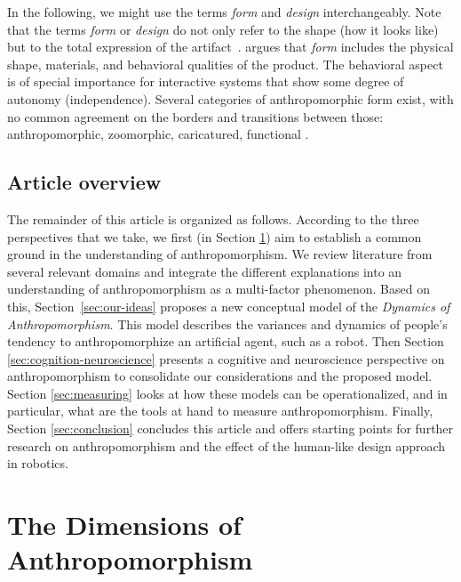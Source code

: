 \documentclass{frontiersSCNS} %
\begin{document}
In the following, we might use the terms \emph{form} and \emph{design}
interchangeably. Note that the terms \textit{form} or {\it design} do not only
refer to the shape (how it looks like) but to the total expression of the
artifact~\citep{bartneck_shaping_2004}. \citet{disalvo_hug:_2003} argues that
\textit{form} includes the physical shape, materials, and behavioral qualities
of the product. The behavioral aspect is of special importance for interactive
systems that show some degree of autonomy (independence).  Several categories of
anthropomorphic form exist, with no common agreement on the borders and
transitions between those: anthropomorphic, zoomorphic, caricatured, functional
\citep{fong_survey_2003}.


\subsection{Article overview}

The remainder of this article is organized as follows.  According to the three
perspectives that we take, we first (in Section \ref{sec:anthropomorphism}) aim
to establish a common ground in the understanding of anthropomorphism. We review
literature from several relevant domains and integrate the different
explanations into an understanding of anthropomorphism as a multi-factor
phenomenon.  Based on this, Section~\ref{sec:our-ideas} proposes a new
conceptual model of the \textit{Dynamics of Anthropomorphism}. This model
describes the variances and dynamics of people's tendency to anthropomorphize an
artificial agent, such as a robot.  Then Section
\ref{sec:cognition-neuroscience} presents a cognitive and neuroscience
perspective on anthropomorphism to consolidate our considerations and the
proposed model.  Section \ref{sec:measuring} looks at how these models can be
operationalized, and in particular, what are the tools at hand to measure
anthropomorphism. Finally, Section \ref{sec:conclusion} concludes this article
and offers starting points for further research on anthropomorphism and the
effect of the human-like design approach in robotics.


%
%
%
%
%
%

\section{The Dimensions of Anthropomorphism}
\label{sec:anthropomorphism}
\end{document}
